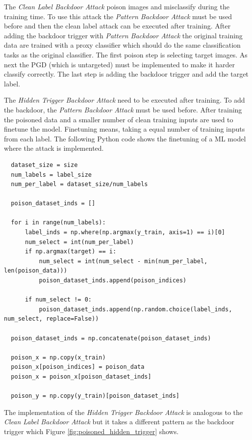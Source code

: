 The \textit{Clean Label Backdoor Attack} \cite{turner2018clean} poison images and misclassify during the training time. To use this attack the \textit{Pattern Backdoor Attack} must be used before and then the clean label attack can be executed after training. After adding the backdoor trigger with \textit{Pattern Backdoor Attack} the original training data are trained with a proxy classifier which should do the same classification tasks as the original classifier. The first poison step is selecting target images. As next the PGD (which is untargeted) must be implemented to make it harder classify correctly. The last step is adding the backdoor trigger and add the target label.

The \textit{Hidden Trigger Backdoor Attack} \cite{DBLP:journals/corr/abs-1910-00033} need to be executed after training. To add the backdoor, the \textit{Pattern Backdoor Attack} must be used before. After training the poisoned data and a smaller number of clean training inputs are used to finetune the model. Finetuning means, taking a equal number of training inputs from each label. The following Python code shows the finetuning of a ML model where the attack is implemented.

\begin{lstlisting}
  dataset_size = size
  num_labels = label_size
  num_per_label = dataset_size/num_labels

  poison_dataset_inds = []

  for i in range(num_labels):
      label_inds = np.where(np.argmax(y_train, axis=1) == i)[0]
      num_select = int(num_per_label)
      if np.argmax(target) == i:
          num_select = int(num_select - min(num_per_label, len(poison_data)))
          poison_dataset_inds.append(poison_indices)

      if num_select != 0:
          poison_dataset_inds.append(np.random.choice(label_inds, num_select, replace=False))

  poison_dataset_inds = np.concatenate(poison_dataset_inds)

  poison_x = np.copy(x_train)
  poison_x[poison_indices] = poison_data
  poison_x = poison_x[poison_dataset_inds]

  poison_y = np.copy(y_train)[poison_dataset_inds]
\end{lstlisting}

The implementation of the \textit{Hidden Trigger Backdoor Attack} is analogous to the \textit{Clean Label Backdoor Attack} but it takes a different pattern as the backdoor trigger which Figure \ref{fig:poisoned_hidden_trigger} shows.

